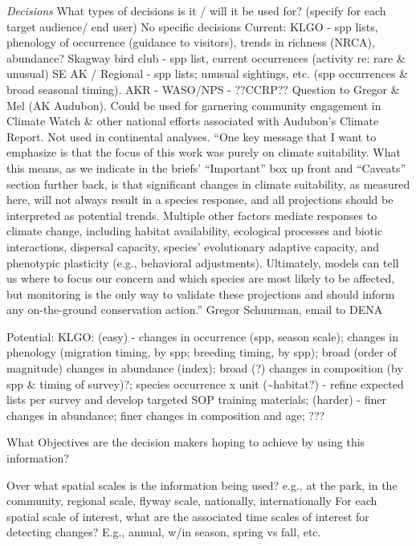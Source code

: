 \documentclass[]{article}
\begin{document}
\emph{Decisions} What types of decisions is it / will it be used for?
(specify for each target audience/ end user) No specific decisions
Current: KLGO - spp lists, phenology of occurrence (guidance to
visitors), trends in richness (NRCA), abundance? Skagway bird club - spp
list, current occurrences (activity re: rare \& unusual) SE AK /
Regional - spp lists; unusual sightings, etc. (spp occurrences \& broad
seasonal timing). AKR - WASO/NPS - ??CCRP?? Question to Gregor \& Mel
(AK Audubon). Could be used for garnering community engagement in
Climate Watch \& other national efforts associated with Audubon's
Climate Report. Not used in continental analyses. ``One key message that
I want to emphasize is that the focus of this work was purely on climate
suitability. What this means, as we indicate in the briefs'
``Important'' box up front and ``Caveats'' section further back, is that
significant changes in climate suitability, as measured here, will not
always result in a species response, and all projections should be
interpreted as potential trends. Multiple other factors mediate
responses to climate change, including habitat availability, ecological
processes and biotic interactions, dispersal capacity, species'
evolutionary adaptive capacity, and phenotypic plasticity (e.g.,
behavioral adjustments). Ultimately, models can tell us where to focus
our concern and which species are most likely to be affected, but
monitoring is the only way to validate these projections and should
inform any on-the-ground conservation action.'' Gregor Schuurman, email
to DENA

Potential: KLGO: (easy) - changes in occurrence (spp, season scale);
changes in phenology (migration timing, by spp; breeding timing, by
spp); broad (order of magnitude) changes in abundance (index); broad (?)
changes in composition (by spp \& timing of survey)?; species occurrence
x unit (\textasciitilde{}habitat?) - refine expected lists per survey
and develop targeted SOP training materials; (harder) - finer changes in
abundance; finer changes in composition and age; ???

What Objectives are the decision makers hoping to achieve by using this
information?

Over what spatial scales is the information being used? e.g., at the
park, in the community, regional scale, flyway scale, nationally,
internationally For each spatial scale of interest, what are the
associated time scales of interest for detecting changes? E.g., annual,
w/in season, spring vs fall, etc.
\end{document}
